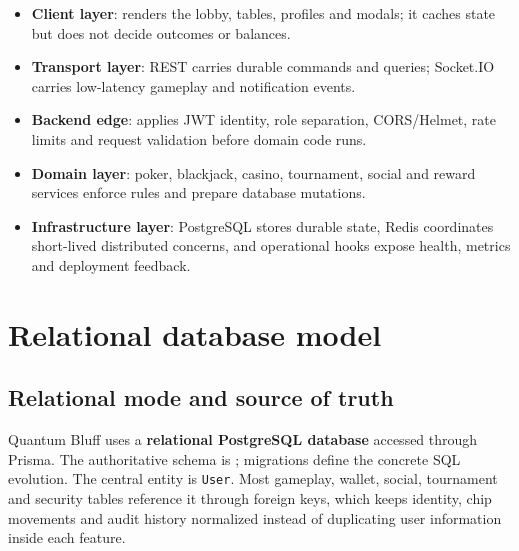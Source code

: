 \documentclass[11pt,a4paper]{article}
\begin{document}
\begin{itemize}
\item \textbf{Client layer}: renders the lobby, tables, profiles and modals; it caches state but does not decide outcomes or balances.
\item \textbf{Transport layer}: REST carries durable commands and queries; Socket.IO carries low-latency gameplay and notification events.
\item \textbf{Backend edge}: applies JWT identity, role separation, CORS/Helmet, rate limits and request validation before domain code runs.
\item \textbf{Domain layer}: poker, blackjack, casino, tournament, social and reward services enforce rules and prepare database mutations.
\item \textbf{Infrastructure layer}: PostgreSQL stores durable state, Redis coordinates short-lived distributed concerns, and operational hooks expose health, metrics and deployment feedback.
\end{itemize}

\section{Relational database model}
\label{app:db}

\subsection{Relational mode and source of truth}

Quantum Bluff uses a \textbf{relational PostgreSQL database} accessed through Prisma. The authoritative schema is ; migrations define the concrete SQL evolution. The central entity is \texttt{User}. Most gameplay, wallet, social, tournament and security tables reference it through foreign keys, which keeps identity, chip movements and audit history normalized instead of duplicating user information inside each feature.
\end{document}
